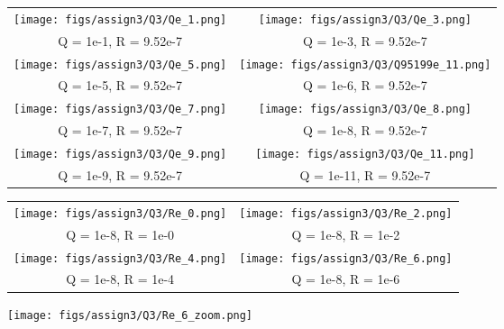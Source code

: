 \documentclass[a4paper]{article}
\begin{document}
\begin{figure}[H]
\begin{adjustwidth}{-3cm}{-3cm}
\centering
\begin{tabular}{cc}
  \texttt{[image: figs/assign3/Q3/Qe\_1.png]} &   \texttt{[image: figs/assign3/Q3/Qe\_3.png]} \\
  Q = 1e-1, R = 9.52e-7 & Q = 1e-3, R = 9.52e-7 \\[8pt]
  \texttt{[image: figs/assign3/Q3/Qe\_5.png]} & \texttt{[image: figs/assign3/Q3/Q95199e\_11.png]} \\
  Q = 1e-5, R = 9.52e-7 & Q = 1e-6, R = 9.52e-7 \\[8pt]
  \texttt{[image: figs/assign3/Q3/Qe\_7.png]} & \texttt{[image: figs/assign3/Q3/Qe\_8.png]} \\
  Q = 1e-7, R = 9.52e-7 & Q = 1e-8, R = 9.52e-7 \\[8pt]
  \texttt{[image: figs/assign3/Q3/Qe\_9.png]} & \texttt{[image: figs/assign3/Q3/Qe\_11.png]}\\
  Q = 1e-9, R = 9.52e-7 & Q = 1e-11, R = 9.52e-7
\end{tabular}
\end{adjustwidth}
\label{fig:QcteR}
\end{figure}


\begin{figure}[H]
\begin{adjustwidth}{-3cm}{-3cm}
\centering
\begin{tabular}{cc}
  \texttt{[image: figs/assign3/Q3/Re\_0.png]} &   \texttt{[image: figs/assign3/Q3/Re\_2.png]} \\
  Q = 1e-8, R = 1e-0 & Q = 1e-8, R = 1e-2 \\[8pt]
 \texttt{[image: figs/assign3/Q3/Re\_4.png]} &   \texttt{[image: figs/assign3/Q3/Re\_6.png]} \\
 Q = 1e-8, R = 1e-4 & Q = 1e-8, R = 1e-6 \\[8pt]
\end{tabular}
\end{adjustwidth}
\label{fig:cteQR}
\end{figure}

\begin{figure}[H]
    \centering
    \texttt{[image: figs/assign3/Q3/Re\_6\_zoom.png]}
    \label{fig:zoomconsistent}
\end{figure}
\end{document}
